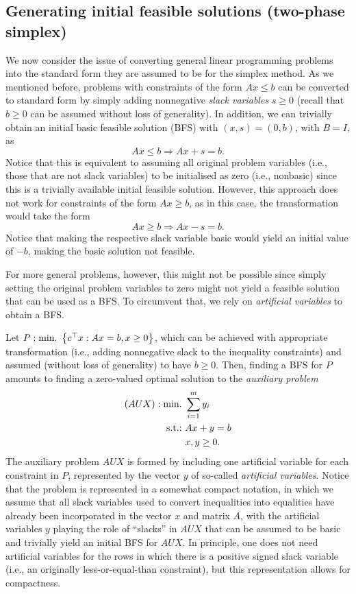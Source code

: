 \subsection{Generating initial feasible solutions (two-phase simplex)} 

We now consider the issue of converting general linear programming problems into the standard form they are assumed to be for the simplex method. As we mentioned before, problems with constraints of the form $Ax \le b$ can be converted to standard form by simply adding nonnegative \emph{slack variables} $s \geq 0$ (recall that $b \ge 0$ can be assumed without loss of generality). In addition, we can trivially obtain an initial basic feasible solution (BFS) with $(x,s) = (0,b)$, with $B = I$, as
%
\begin{equation*}
		Ax \leq b \Rightarrow Ax + s = b.
\end{equation*}
%
Notice that this is equivalent to assuming all original problem variables (i.e., those that are not slack variables) to be initialised as zero (i.e., nonbasic) since this is a trivially available initial feasible solution. However, this approach does not work for constraints of the form $Ax \ge b$, as in this case, the transformation would take the form 
%
\begin{equation*}
	Ax \geq b \Rightarrow Ax - s = b.	
\end{equation*}
%
Notice that making the respective slack variable basic would yield an initial value of $-b$, making the basic solution not feasible.

For more general problems, however, this might not be possible since simply setting the original problem variables to zero might not yield a feasible solution that can be used as a BFS. To circumvent that, we rely on \emph{artificial variables} to obtain a BFS.

Let $P : \mathop{\text{min.~}}\left\{ c^\top x : Ax = b, x \geq 0 \right \}$, which can be achieved with appropriate transformation (i.e., adding nonnegative slack to the inequality constraints) and assumed (without loss of generality) to have $b \geq 0$. Then, finding a BFS for $P$ amounts to finding a zero-valued optimal solution to the \emph{auxiliary problem}
%
\begin{align*}
	(AUX) : \mathop{\text{min.~}} &\sum_{i=1}^m y_i \\
	\mathop{\text{s.t.:~}} & Ax + y = b \\
	    & x,y \geq 0.	
\end{align*}
%
The auxiliary problem $AUX$ is formed by including one artificial variable for each constraint in $P$, represented by the vector $y$ of so-called \emph{artificial variables}. Notice that the problem is represented in a somewhat compact notation, in which we assume that all slack variables used to convert inequalities into equalities have already been incorporated in the vector $x$ and matrix $A$, with the artificial variables $y$ playing the role of ``slacks'' in $AUX$ that can be assumed to be basic and trivially yield an initial BFS for $AUX$. In principle, one does not need artificial variables for the rows in which there is a positive signed slack variable (i.e., an originally less-or-equal-than constraint), but this representation allows for compactness. 

